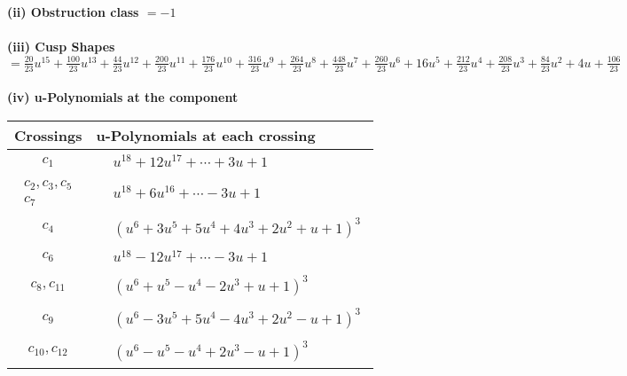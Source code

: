 \documentclass[1p]{elsarticle_modified}
\theoremstyle{definition}
\begin{document}
\flushleft \textbf{(ii) Obstruction class $= -1$}\\~\\
\flushleft \textbf{(iii) Cusp Shapes $= \frac{20}{23} u^{15}+\frac{100}{23} u^{13}+\frac{44}{23} u^{12}+\frac{200}{23} u^{11}+\frac{176}{23} u^{10}+\frac{316}{23} u^9+\frac{264}{23} u^8+\frac{448}{23} u^7+\frac{260}{23} u^6+16 u^5+\frac{212}{23} u^4+\frac{208}{23} u^3+\frac{84}{23} u^2+4 u+\frac{106}{23}$}\\~\\
\newpage\renewcommand{\arraystretch}{1}
\flushleft \textbf{(iv) u-Polynomials at the component}\newline \\
\begin{tabular}{m{50pt}|m{274pt}}
Crossings & \hspace{64pt}u-Polynomials at each crossing \\
\hline $$\begin{aligned}c_{1}\end{aligned}$$&$\begin{aligned}
&u^{18}+12 u^{17}+\cdots+3 u+1
\end{aligned}$\\
\hline $$\begin{aligned}c_{2},c_{3},c_{5}\\c_{7}\end{aligned}$$&$\begin{aligned}
&u^{18}+6 u^{16}+\cdots-3 u+1
\end{aligned}$\\
\hline $$\begin{aligned}c_{4}\end{aligned}$$&$\begin{aligned}
&(u^6+3 u^5+5 u^4+4 u^3+2 u^2+u+1)^3
\end{aligned}$\\
\hline $$\begin{aligned}c_{6}\end{aligned}$$&$\begin{aligned}
&u^{18}-12 u^{17}+\cdots-3 u+1
\end{aligned}$\\
\hline $$\begin{aligned}c_{8},c_{11}\end{aligned}$$&$\begin{aligned}
&(u^6+u^5- u^4-2 u^3+u+1)^3
\end{aligned}$\\
\hline $$\begin{aligned}c_{9}\end{aligned}$$&$\begin{aligned}
&(u^6-3 u^5+5 u^4-4 u^3+2 u^2- u+1)^3
\end{aligned}$\\
\hline $$\begin{aligned}c_{10},c_{12}\end{aligned}$$&$\begin{aligned}
&(u^6- u^5- u^4+2 u^3- u+1)^3
\end{aligned}$\\
\hline
\end{tabular}\\~\\
\end{document}
